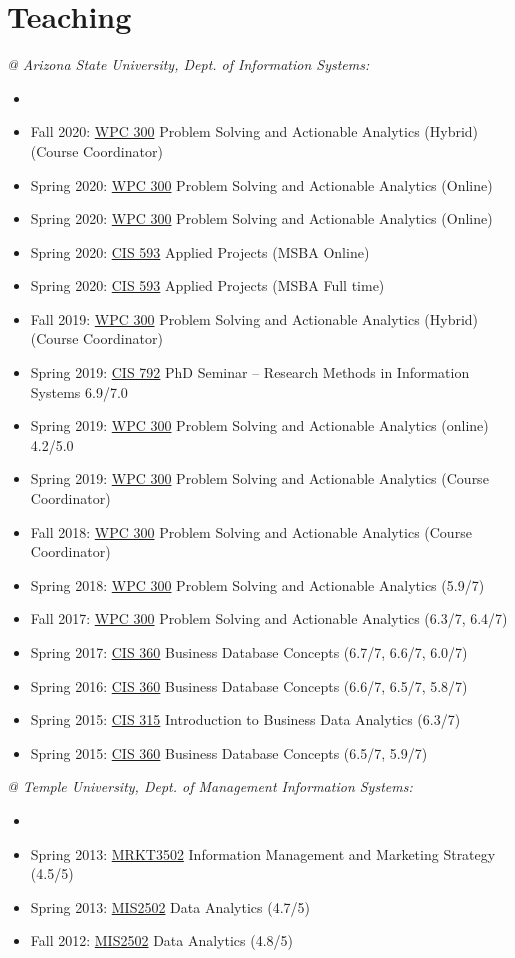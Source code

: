\documentclass[paper=letter,fontsize=10pt]{scrartcl} %
\newcommand{\NewPart}[2]{\section*{{#1} #2}}
\newcommand{\CourseEntry}[4]{
		\noindent \item{#1: \ul{#2} #3 #4}}
\begin{document}



\NewPart{Teaching}{}
\noindent\textit{@ Arizona State University, Dept. of Information Systems:}
\begin{itemize}
\item[]
\vspace{-18pt}
\CourseEntry{Fall 2020}{WPC 300}{Problem Solving and Actionable Analytics (Hybrid)}{(Course Coordinator)}
\CourseEntry{Spring 2020}{WPC 300}{Problem Solving and Actionable Analytics (Online)}{}
\CourseEntry{Spring 2020}{WPC 300}{Problem Solving and Actionable Analytics (Online)}{}
\CourseEntry{Spring 2020}{CIS 593}{Applied Projects (MSBA Online)}{}
\CourseEntry{Spring 2020}{CIS 593}{Applied Projects (MSBA Full time)}{}
\CourseEntry{Fall 2019}{WPC 300}{Problem Solving and Actionable Analytics (Hybrid)}{(Course Coordinator)}
\CourseEntry{Spring 2019}{CIS 792}{PhD Seminar -- Research Methods in Information Systems}{6.9/7.0}
\CourseEntry{Spring 2019}{WPC 300}{Problem Solving and Actionable Analytics (online)}{4.2/5.0}
\CourseEntry{Spring 2019}{WPC 300}{Problem Solving and Actionable Analytics}{(Course Coordinator)}
\CourseEntry{Fall 2018}{WPC 300}{Problem Solving and Actionable Analytics}{(Course Coordinator)}
\CourseEntry{Spring 2018}{WPC 300}{Problem Solving and Actionable Analytics}{(5.9/7)}
\CourseEntry{Fall 2017}{WPC 300}{Problem Solving and Actionable Analytics}{(6.3/7, 6.4/7)}
\CourseEntry{Spring 2017}{CIS 360}{Business Database Concepts}{(6.7/7, 6.6/7, 6.0/7)}
\CourseEntry{Spring 2016}{CIS 360}{Business Database Concepts}{(6.6/7, 6.5/7, 5.8/7)}
\CourseEntry{Spring 2015}{CIS 315}{Introduction to Business Data Analytics}{(6.3/7)}
\CourseEntry{Spring 2015}{CIS 360}{Business Database Concepts}{(6.5/7, 5.9/7)}

\end{itemize}

\vspace{6pt}
\noindent\textit{@ Temple University, Dept. of Management Information Systems:}
\begin{itemize}
\vspace{-18pt}
\item[]
\CourseEntry{Spring 2013}{MRKT3502}{Information Management and Marketing Strategy}{(4.5/5)}
\CourseEntry{Spring 2013}{MIS2502}{Data Analytics}{(4.7/5)}
\CourseEntry{Fall 2012}{MIS2502}{Data Analytics}{(4.8/5)}

\end{itemize}
\end{document}
